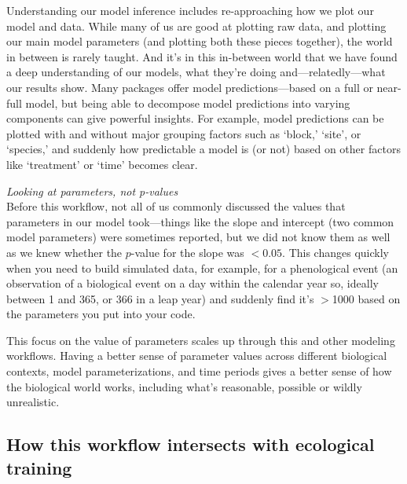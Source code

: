 \documentclass[11pt]{article}
\begin{document}
{Understanding our model inference includes re-approaching how we plot our model and data. While many of us are good at plotting raw data, and plotting our main model parameters (and plotting both these pieces together), the world in between is rarely taught. And it's in this in-between world that we have found a deep understanding of our models, what they're doing and---relatedly---what our results show. Many packages offer model predictions---based on a full or near-full model, but being able to decompose model predictions into varying components can give powerful insights. For example, model predictions can be plotted with and without major grouping factors such as `block,' `site', or `species,' and suddenly how predictable a model is (or not) based on other factors like `treatment' or `time' becomes clear. 

 \emph{Looking at parameters, not p-values} \\
Before this workflow, not all of us commonly discussed the values that parameters in our model took---things like the slope and intercept (two common model parameters) were sometimes reported, but we did not know them as well as we knew whether the $p$-value for the slope was $<0.05$. This changes quickly when you need to build simulated data, for example, for a phenological event (an observation of a biological event on a day within the calendar year so, ideally between 1 and 365, or 366 in a leap year) and suddenly find it's $>$1000 based on the parameters you put into your code. 

This focus on the value of parameters scales up through this and other modeling workflows. Having a better sense of parameter values across different biological contexts, model parameterizations, and time periods gives a better sense of how the biological world works, including what's reasonable, possible or wildly unrealistic. %

\subsection*{How this workflow intersects with ecological training} %

}
\end{document}
